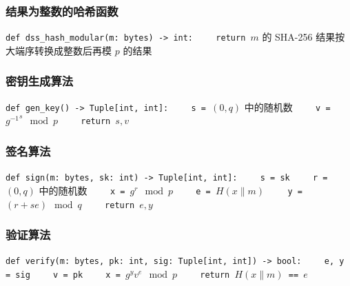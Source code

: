 \documentclass[12pt,a4paper]{article}
\begin{document}
\subsubsection*{结果为整数的哈希函数}

{
\noindent
\lstinline{def dss_hash_modular(m: bytes) -> int:}
\newline
\lstinline{    return }$ m $ 的 SHA-256 结果按大端序转换成整数后再模 $ p $ 的结果
}

\subsubsection*{密钥生成算法}

{
\noindent
\lstinline{def gen_key() -> Tuple[int, int]:}
\newline
\lstinline{    s = }$ (0, q) $ 中的随机数
\newline
\lstinline{    v = }$ {g^{-1}}^s \mod p $
\newline
\lstinline{    return }$ s, v $
}

\subsubsection*{签名算法}

{
\noindent
\lstinline{def sign(m: bytes, sk: int) -> Tuple[int, int]:}
\newline
\lstinline{    s = sk}
\newline
\lstinline{    r = }$ (0, q) $ 中的随机数
\newline
\lstinline{    x = }$ g^r \mod p $
\newline
\lstinline{    e = }$ H(x \parallel m) $
\newline
\lstinline{    y = }$ (r + se) \mod q $
\newline
\lstinline{    return }$ e, y $
}

\subsubsection*{验证算法}

{
\noindent
\lstinline{def verify(m: bytes, pk: int, sig: Tuple[int, int]) -> bool:}
\newline
\lstinline{    e, y = sig}
\newline
\lstinline{    v = pk}
\newline
\lstinline{    x = }$ g^y v^e \mod p $
\newline
\lstinline{    return }$ H(x \parallel m) $\lstinline{ == }$ e $
}
\end{document}
